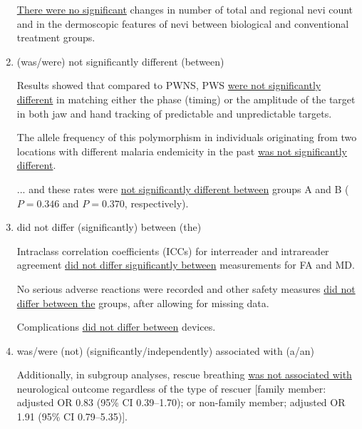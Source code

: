 \documentclass[a4paper]{ctexbook}
\begin{document}
\begin{enumerate}
      \begin{eg}{}
        \uline{There were no significant} changes in number of total and regional nevi count and in the dermoscopic features of nevi between biological and conventional treatment groups.
      \end{eg}

      \item (was/were) not significantly different (between)
      \begin{eg}{}
        Results showed that compared to PWNS, PWS \uline{were not significantly different} in matching either the phase (timing) or the amplitude of the target in both jaw and hand tracking of predictable and unpredictable targets.
      \end{eg}

      \begin{eg}{}
        The allele frequency of this polymorphism in individuals originating from two locations with different malaria endemicity in the past \uline{was not significantly different}.  
      \end{eg}

      \begin{eg}{}
        ... and these rates were \uline{not significantly different between} groups A and B ($P=0. 346$ and $P=0. 370$, respectively).          
      \end{eg}

      \item did not differ (significantly) between (the)
      \begin{eg}{}
        Intraclass correlation coefficients (ICCs) for interreader and intrareader agreement \uline{did not differ significantly between} measurements for FA and MD. 
      \end{eg}

      \begin{eg}{}
        No serious adverse reactions were recorded and other safety measures \uline{did not differ between the} groups, after allowing for missing data. 
      \end{eg}

      \begin{eg}{}
        Complications \uline{did not differ between} devices.
      \end{eg}

      \item was/were (not) (significantly/independently) associated with (a/an)
      \begin{eg}{}
        Additionally, in subgroup analyses, rescue breathing \uline{was not associated with} neurological outcome regardless of the type of rescuer [family member: adjusted OR $0. 83$ (95\% CI 0.39--1.70); or non-family member; adjusted OR 1.91 (95\% CI 0.79--5.35)].  
      \end{eg}


\end{enumerate}
\end{document}
